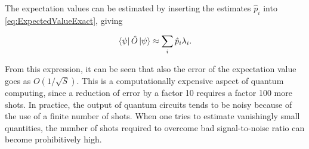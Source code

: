 The expectation values can be estimated by inserting the estimates $\hat{p}_i$ into \autoref{eq:ExpectedValueExact}, giving

\begin{equation}\label{eq:ExpectedValueEstimate}
    \bra{\psi}\hat{O}\ket{\psi} \approx \sum_{i} \hat{p}_i\lambda_i.
\end{equation}

From this expression, it can be seen that also the error of the expectation value goes as $O(1/\sqrt{S})$. This is a computationally expensive aspect of quantum computing, since a reduction of error by a factor 10 requires a factor 100 more shots. In practice, the output of quantum circuits tends to be noisy because of the use of a finite number of shots. When one tries to estimate vanishingly small quantities, the number of shots required to overcome bad signal-to-noise ratio can become prohibitively high. 





